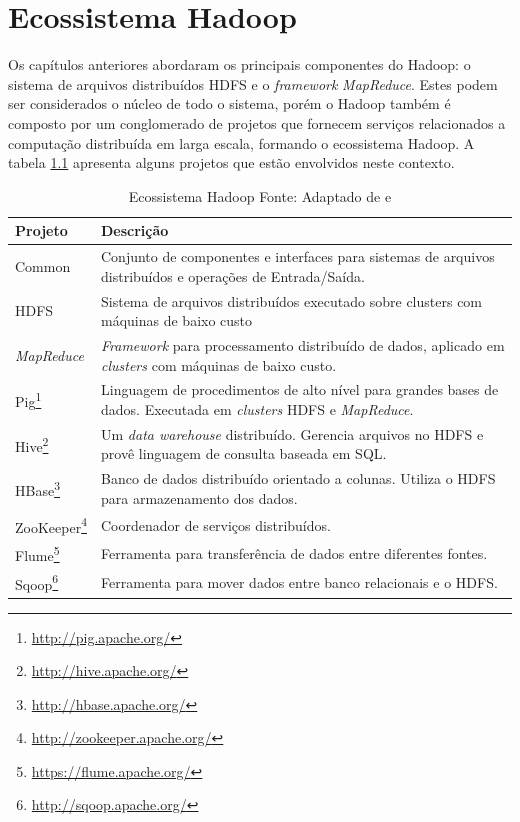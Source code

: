 \chapter{Ecossistema Hadoop}
\label{cap:eco}

Os capítulos anteriores abordaram os principais componentes do Hadoop: o sistema de arquivos distribuídos HDFS e o \textit{framework} \textit{MapReduce}. Estes podem ser considerados o núcleo de todo o sistema, porém o Hadoop também é composto por um conglomerado de projetos que fornecem serviços relacionados a computação distribuída em larga escala, formando o ecossistema Hadoop. A tabela \ref{tab-eco} apresenta alguns projetos que estão envolvidos neste contexto.

\begin{savenotes}
\begin{table}[!ht]
\begin{center}
  \begin{tabular}{|p{3cm}|p{7cm}|}
	\hline
	Projeto & Descrição
	\\ \hline
	Common & Conjunto de componentes e interfaces para sistemas de arquivos distribuídos e operações de Entrada/Saída.
	\\ \hline
	HDFS & Sistema de arquivos distribuídos executado sobre clusters com máquinas de baixo custo
	\\ \hline
	\textit{MapReduce} & \textit{Framework} para processamento distribuído de dados, aplicado em \textit{clusters} com máquinas de baixo custo.
	\\ \hline
	Pig\footnote{\url{http://pig.apache.org/}} & Linguagem de procedimentos de alto nível para grandes bases de dados. Executada em \textit{clusters} HDFS e \textit{MapReduce}.
	\\ \hline
	Hive\footnote{\url{http://hive.apache.org/}} & Um \textit{data warehouse} distribuído. Gerencia arquivos no HDFS e provê linguagem de consulta baseada em SQL.
	\\ \hline
	HBase\footnote{\url{http://hbase.apache.org/}} & Banco de dados distribuído orientado a colunas. Utiliza o HDFS para armazenamento dos dados.
	\\ \hline
	ZooKeeper\footnote{\url{http://zookeeper.apache.org/}} & Coordenador de serviços distribuídos.
	\\ \hline
	Flume\footnote{\url{https://flume.apache.org/}} & Ferramenta para transferência de dados entre diferentes fontes.
	\\ \hline
	Sqoop\footnote{\url{http://sqoop.apache.org/}} & Ferramenta para mover dados entre banco relacionais e o HDFS.
	\\ \hline
  \end{tabular}
  \captionsetup{justification=centering}
  \caption[Ecossistema Hadoop]{Ecossistema Hadoop
  \protect\linebreak Fonte: Adaptado de \cite{white2012} e \cite{shvachko2010}}
\label{tab-eco}
\end{center}
\end{table}
\end{savenotes}

